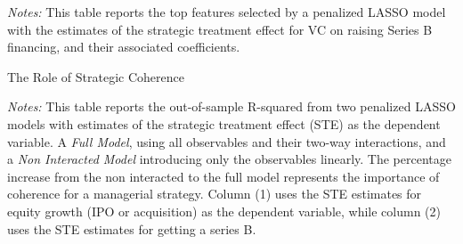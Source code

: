 \documentclass[11pt]{article}
\begin{document}
\begin{center}
\begin{table}[htp]
\begin{center}
{    \begin{threeparttable}
    
     \begin{tablenotes}
      \item {\footnotesize
        \emph{Notes:} This table reports the top features selected by a penalized LASSO model with the estimates of the strategic treatment effect for VC on raising Series B financing, and their associated coefficients.}
  		\end{tablenotes}
  		\end{threeparttable}
  }
\end{center}
\end{table}



\begin{table}[htp]
\caption{The Role of Strategic Coherence}
\begin{center}
  \begin{threeparttable}
    
    \begin{tablenotes}
    \item {\footnotesize
      \emph{Notes:} This table reports the out-of-sample R-squared from two penalized LASSO models with estimates of the strategic treatment effect (STE) as the dependent variable. A \emph{Full Model}, using all observables and their two-way interactions, and a \emph{Non Interacted Model} introducing only the observables linearly. The percentage increase from the non interacted to the full model represents the importance of coherence for a managerial strategy. Column (1) uses the STE estimates for equity growth (IPO or acquisition) as the dependent variable, while column (2) uses the STE estimates for getting a series B.}
		\end{tablenotes}
		\end{threeparttable}
	\end{center}
\end{table}


\end{center}
\end{document}
